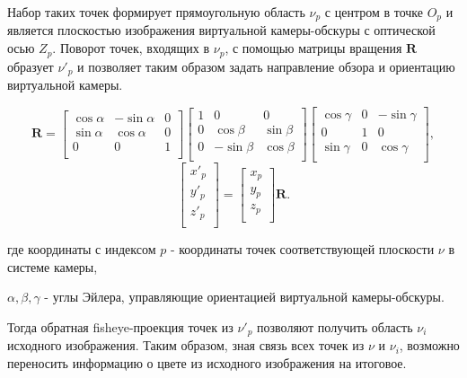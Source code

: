 Набор таких точек формирует прямоугольную область $\nu_p$ с центром в точке $O_p$ и является плоскостью изображения
 виртуальной камеры-обскуры  с оптической осью $Z_p$. Поворот точек, входящих в $\nu_p$, с помощью матрицы вращения 
 $\bm{R}$ образует $\nu'_p$ и позволяет таким образом задать направление обзора и ориентацию виртуальной камеры. 
\begin{eqseries}
    \begin{equation}
        \label{eq:R}
        \bm{R} = \left[\begin{matrix}\cos{\alpha}&-\sin{\alpha}&0\\\sin{\alpha}&\cos{\alpha}&0\\0&0&1\\\end{matrix}\right]\left[\begin{matrix}1&0&0\\0&\cos{\beta}&\sin{\beta}\\0&-\sin{\beta}&\cos{\beta}\\\end{matrix}\right]\left[\begin{matrix}\cos{\gamma}&0&-\sin{\gamma}\\0&1&0\\\sin{\gamma}&0&\cos{\gamma}\\\end{matrix}\right],
    \end{equation} 
    \begin{equation}
        \label{eq:sweeped}
        \left[\begin{matrix}x'_p\\y'_p\\z'_p\\\end{matrix}\right] = \left[\begin{matrix}x_p\\y_p\\z_p\\\end{matrix}\right] \bm{R}.
    \end{equation}  
\end{eqseries}

где координаты с индексом $p$ -  координаты точек соответствующей плоскости $\nu$ в системе камеры, 

\qquad $\alpha, \beta, \gamma$ - углы Эйлера, управляющие  ориентацией виртуальной камеры-обскуры. 

Тогда обратная fisheye-проекция точек из $\nu'_p$ позволяют получить область $\nu_i$ исходного изображения. 
Таким образом, зная связь всех точек из $\nu$ и $\nu_i$, возможно переносить информацию о цвете из 
исходного изображения на итоговое.  

